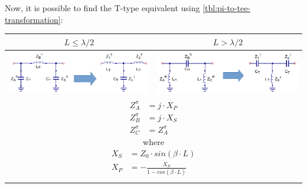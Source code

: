 \noindent Now, it is possible to find the T-type equivalent using \ref{tbl:pi-to-tee-transformation}:

\begin{table}[H]
  \centering
  \begin{tabular}{ | c | c | }
    \hline
    $L \leq \lambda/2$ & $L > \lambda/2$\\ \hline
    \begin{minipage}{.4\textwidth}
      \includegraphics[width=\linewidth]{TL-circuit-equivalent-LP-Pi-Tee}
    \end{minipage}
    &
    \begin{minipage}{.4\textwidth}
      \includegraphics[width=\linewidth]{TL-circuit-equivalent-HP-Pi-Tee}
    \end{minipage}
\\ \hline
    \multicolumn{2}{|c|}{
    \begin{minipage}{.4\textwidth}
         { \begin{align}
              Z_A^{\pi} &= j \cdot X_P\\
              Z_B^{\pi} &= j \cdot X_S \\
              Z_C^{\pi} &= Z_A^{\pi} 
         \end{align}
        \noindent where
        \begin{align}
              X_S &= Z_0 \cdot sin(\beta \cdot L)\\
              X_P &= -\frac{X_S}{1 - cos(\beta \cdot L)}
         \end{align}
       }\end{minipage}}
\\ \hline
    \begin{minipage}{.4\textwidth}

\end{minipage}
\end{tabular}
\end{table}

